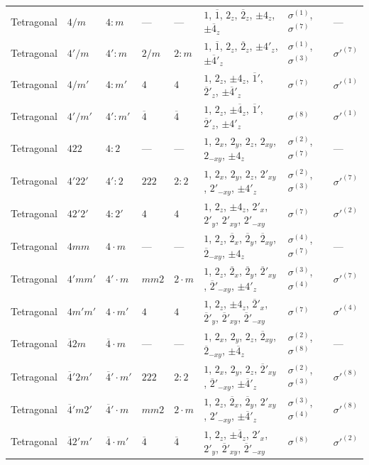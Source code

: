 \documentclass[a4paper,11pt]{article}
\newcommand{\ob}[1]{\overline{#1}}
\newcommand{\sg}[1]{\sigma^{(#1)}}
\newcommand{\sgp}[1]{\sigma'^{(#1)}}
\begin{document}
\begin{landscape}
\begin{longtable}{l l l l l p{9.5cm} l l}
Tetragonal & $4/m$ & $4{:}m$ & --- & --- & $1$, $\ob{1}$, $2_z$, $\ob{2}_z$, $\pm 4_z$, $\pm\ob{4}_z$ & $\sg{1}$, $\sg{7}$ & --- \\
Tetragonal & $4'/m$ & $4'{:}m$ & $2/m$ & $2{:}m$ & $1$, $\ob{1}$, $2_z$, $\ob{2}_z$, $\pm 4'_z$, $\pm\ob{4}'_z$ & $\sg{1}$, $\sg{3}$ & $\sgp{7}$ \\
Tetragonal & $4/m'$ & $4{:}m'$ & $4$ & $4$ & $1$, $2_z$, $\pm 4_z$, $\ob{1}'$, $\ob{2}'_z$, $\pm\ob{4}'_z$ & $\sg{7}$ & $\sgp{1}$ \\
Tetragonal & $4'/m'$ & $4'{:}m'$ & $\ob{4}$ & $\ob{4}$ & $1$, $2_z$, $\pm\ob{4}_z$, $\ob{1}'$, $\ob{2}'_z$, $\pm 4'_z$ & $\sg{8}$ & $\sgp{1}$ \\
\newpage
Tetragonal & $422$ & $4{:}2$ & --- & --- & $1$, $2_x$, $2_y$, $2_z$, $2_{xy}$, $2_{-xy}$, $\pm 4_z$ & $\sg{2}$, $\sg{7}$ & --- \\
Tetragonal & $4'22'$ & $4'{:}2$ & $222$ & $2{:}2$ & $1$, $2_x$, $2_y$, $2_z$, $2'_{xy}$, $2'_{-xy}$, $\pm 4'_z$ & $\sg{2}$, $\sg{3}$ & $\sgp{7}$ \\
Tetragonal & $42'2'$ & $4{:}2'$ & $4$ & $4$ & $1$, $2_z$, $\pm 4_z$, $2'_x$, $2'_y$, $2'_{xy}$, $2'_{-xy}$ & $\sg{7}$ & $\sgp{2}$ \\
Tetragonal & $4mm$ & $4{\cdot}m$ & --- & --- & $1$, $2_z$, $\ob{2}_x$, $\ob{2}_y$, $\ob{2}_{xy}$, $\ob{2}_{-xy}$, $\pm 4_z$ & $\sg{4}$, $\sg{7}$ & --- \\
Tetragonal & $4'mm'$ & $4'{\cdot}m$ & $mm2$ & $2{\cdot}m$ & $1$, $2_z$, $\ob{2}_x$, $\ob{2}_y$, $\ob{2}'_{xy}$, $\ob{2}'_{-xy}$, $\pm 4'_z$ & $\sg{3}$, $\sg{4}$ & $\sgp{7}$ \\
Tetragonal & $4m'm'$ & $4{\cdot}m'$ & $4$ & $4$ & $1$, $2_z$, $\pm 4_z$, $\ob{2}'_x$, $\ob{2}'_y$, $\ob{2}'_{xy}$, $\ob{2}'_{-xy}$ & $\sg{7}$ & $\sgp{4}$ \\
Tetragonal & $\ob{4}2m$ & $\ob{4}{\cdot}m$ & --- & --- & $1$, $2_x$, $2_y$, $2_z$, $\ob{2}_{xy}$, $\ob{2}_{-xy}$, $\pm\ob{4}_z$ & $\sg{2}$, $\sg{8}$ & --- \\
Tetragonal & $\ob{4}'2m'$ & $\ob{4}'{\cdot}m'$ & $222$ & $2{:}2$ & $1$, $2_x$, $2_y$, $2_z$, $\ob{2}'_{xy}$, $\ob{2}'_{-xy}$, $\pm\ob{4}'_z$ & $\sg{2}$, $\sg{3}$ & $\sgp{8}$ \\
Tetragonal & $\ob{4}'m2'$ & $\ob{4}'{\cdot}m$ & $mm2$ & $2{\cdot}m$ & $1$, $2_z$, $\ob{2}_x$, $\ob{2}_y$, $2'_{xy}$, $2'_{-xy}$, $\pm\ob{4}'_z$ & $\sg{3}$, $\sg{4}$ & $\sgp{8}$ \\
Tetragonal & $\ob{4}2'm'$ & $\ob{4}{\cdot}m'$ & $\ob{4}$ & $\ob{4}$ & $1$, $2_z$, $\pm\ob{4}_z$, $2'_x$, $2'_y$, $\ob{2}'_{xy}$, $\ob{2}'_{-xy}$ & $\sg{8}$ & $\sgp{2}$ \\

\end{longtable}
\end{landscape}
\end{document}
